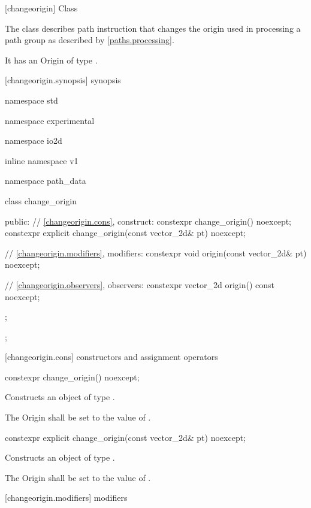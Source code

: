  [changeorigin] {Class }

\pnum
{}
The class  describes path instruction that changes the origin used in processing a path group as described by \ref{paths.processing}.

\pnum
It has an Origin of type .

 [changeorigin.synopsis] { synopsis}

\begin{codeblock}
namespace std { namespace experimental { namespace io2d { inline namespace v1 {
  namespace path_data {
    class change_origin {
    public:
      // \ref{changeorigin.cons}, construct:
      constexpr change_origin() noexcept;
      constexpr explicit change_origin(const vector_2d& pt) noexcept;

      // \ref{changeorigin.modifiers}, modifiers:
      constexpr void origin(const vector_2d& pt) noexcept;

      // \ref{changeorigin.observers}, observers:
      constexpr vector_2d origin() const noexcept;
    };
  };
} } } }
\end{codeblock}

 [changeorigin.cons] { constructors and assignment operators}

\begin{itemdecl}
constexpr change_origin() noexcept;
\end{itemdecl}
\begin{itemdescr}
\pnum
\effects
Constructs an object of type .

\pnum
The Origin shall be set to the value of .
\end{itemdescr}

\begin{itemdecl}
constexpr explicit change_origin(const vector_2d& pt) noexcept;
\end{itemdecl}
\begin{itemdescr}
\pnum
\effects
Constructs an object of type .

\pnum
The Origin shall be set to the value of .
\end{itemdescr}

 [changeorigin.modifiers]{ modifiers}

